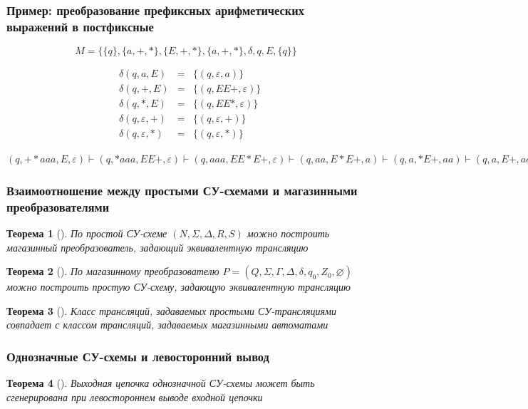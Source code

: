 \documentclass{beamer}
\newtheorem{rutheorem}{Теорема}
\begin{document}
\begin{frame}[fragile]
  \transwipe[direction=90]
  \frametitle{Пример: преобразование префиксных арифметических выражений в постфиксные}
$$M = \{ \{ q \}, \{ a, +, * \}, \{ E, +, * \}, \{ a, +, * \}, \delta, q, E, \{ q \} \}$$

$$
\begin{array}{crcl}
&\delta(q, a, E)& = & \{ (q, \varepsilon, a) \} \\
&\delta(q, +, E)& = & \{ (q, EE+, \varepsilon) \} \\
&\delta(q, *, E)& = & \{ (q, EE*, \varepsilon) \} \\
&\delta(q, \varepsilon, +)& = & \{ (q, \varepsilon, +) \} \\
&\delta(q, \varepsilon, *)& = & \{ (q, \varepsilon, *) \}
\end{array}
$$

\vfill 

$(q, +*aaa, E, \varepsilon) \vdash (q, *aaa, EE+, \varepsilon) \vdash (q, aaa, EE*E+, \varepsilon) \vdash (q, aa, E*E+, a) \vdash (q, a, *E+, aa) \vdash (q, a, E+, aa*) \vdash (q, \varepsilon, +, aa*a) \vdash (q, \varepsilon, \varepsilon, aa*a+)$
\end{frame}

\begin{frame}[fragile]
  \transwipe[direction=90]
  \frametitle{Взаимоотношение между простыми СУ-схемами и магазинными преобразователями}
  \begin{rutheorem}[]
    По простой СУ-схеме $( N, \Sigma, \Delta, R, S )$  можно построить магазинный преобразователь, задающий эквивалентную трансляцию
  \end{rutheorem}
  
  \vfill

  \begin{rutheorem}[]
    По магазинному преобразователю $P = (Q, \Sigma, \Gamma, \Delta, \delta, q_0, Z_0, \varnothing) $ можно построить простую СУ-схему, задающую эквивалентную трансляцию
  \end{rutheorem}

  \vfill

  \begin{rutheorem}[]
    Класс трансляций, задаваемых простыми СУ-трансляциями совпадает с классом трансляций, задаваемых магазинными автоматами
  \end{rutheorem}
\end{frame}


\begin{frame}[fragile]
  \transwipe[direction=90]
  \frametitle{Однозначные СУ-схемы и левосторонний вывод}



\begin{rutheorem}[]
Выходная цепочка однозначной СУ-схемы может быть сгенерирована при левостороннем выводе входной цепочки
\end{rutheorem}

\end{frame}
\end{document}
